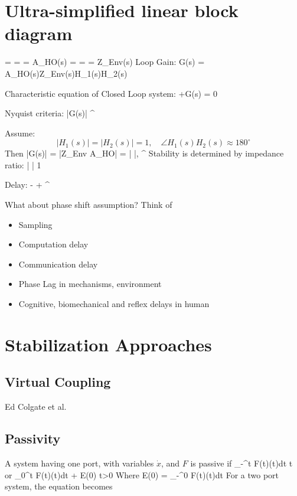 \documentclass[letterpaper]{article}
\begin{document}
\setpagewiselinenumbers        %
\modulolinenumbers[1]          %
 
\section{Ultra-simplified linear block diagram}
\beq
{} =  =  = A_{HO}(s)
\eeq
\beq
{} =  =  = Z_{Env}(s)
\eeq
Loop Gain:
\beq
G(s) = A_{HO}(s)Z_{Env}(s)H_1(s)H_2(s)
\eeq

Characteristic equation of Closed Loop system:
+G(s)  = 0
\eeq

Nyquist criteria:
\beq
|G(s)|   \quad {} \quad {} ^\circ
\eeq

Assume: 
\[
|H_1(s)|  = |H_2(s)| = 1, \quad \angle{H_1(s)H_2(s)} \approx 180^\circ
\]
Then 
\beq
|G(s)| = |Z_{Env} A_{HO}| = \left | \right |,\quad {} ^\circ
\eeq
Stability is determined by impedance ratio:
\beq
\left | \right |  1
\eeq

Delay:
\beq
{} -  +  ^\circ
\eeq

What about phase shift assumption?  Think of 
\begin{itemize}
 \item Sampling
 \item Computation delay
 \item Communication delay
 \item Phase Lag in mechanisms, environment
 \item Cognitive, biomechanical and reflex delays in human
\end{itemize}

\section{Stabilization Approaches}
\subsection{Virtual Coupling}
Ed Colgate et al. 
\subsection{Passivity}
A system having one port, with variables $\dot{x}$, and $F$ is passive if
\beq
\int_{-\infty}^{t} F(t)(t)dt  \quad \forall t
\eeq
or
\beq
\int_{0}^{t} F(t)(t)dt + E(0)  \quad \forall t>0
\eeq
Where
\beq
E(0) = \int_{-\infty}^{0} F(t)(t)dt
\eeq
For a two port system, the equation becomes
\end{document}
